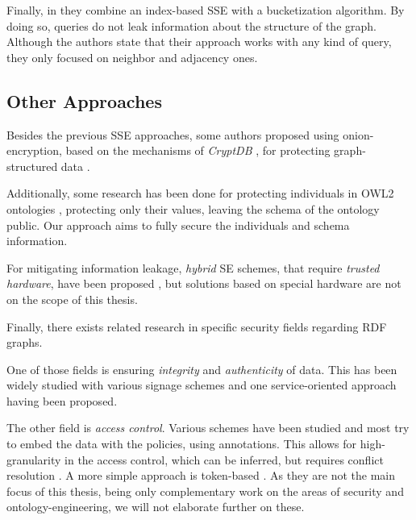 Finally, in \autocite{Suntaxi2021-sj} they combine an index-based \gls{SSE} with a bucketization algorithm. By doing so, queries do not leak information about the structure of the graph. Although the authors state that their approach works with any kind of query, they only focused on neighbor and adjacency ones. 

\subsection{Other Approaches}
\label{ch2:sec:other}


Besides the previous \gls{SSE} approaches, some authors proposed using onion-encryption, based on the mechanisms of \emph{CryptDB} \autocite{Popa2011-zb, Popa2012-bw, Popa2011-ci}, for protecting graph-structured data \autocite{Aburawi2018-pq}. 

Additionally, some research has been done for protecting individuals in \gls{OWL2} ontologies \autocite{Nejjahi2019-ig}, protecting only their values, leaving the schema of the ontology public. Our approach aims to fully secure the individuals and schema information. 
 
For mitigating information leakage, \emph{hybrid} \gls{SE} schemes, that require \emph{trusted hardware}, have been proposed \autocite{Ferreira2020-ze}, but solutions based on special hardware are not on the scope of this thesis.

Finally, there exists related research in specific security fields regarding \gls{RDF} graphs. 

One of those fields is ensuring \emph{integrity} and \emph{authenticity} of data. This has been widely studied with various signage schemes \autocite{Carroll2003-zi, Tummarello2005-qb,Kasten2013-rf, Kasten2014-ru, Kasten2014-ny, Sutton2018-ya} and one service-oriented approach \autocite{Mana2011-bm} having been proposed. 

The other field is \emph{access control}. Various schemes have been studied and most try to embed the data with the policies, using annotations. This allows for high-granularity in the access control, which can be inferred, but requires conflict resolution \autocite{Jain2006-zy, Abel2007-sf, Flouris2010-bf, Papakonstantinou2012-cu, Costabello2012-ow,Kirrane2013-ef, Costabello2013-tb}. A more simple approach is token-based \autocite{Khaled2010-yg}. As they are not the main focus of this thesis, being only complementary work on the areas of security and ontology-engineering, we will not elaborate further on these.

